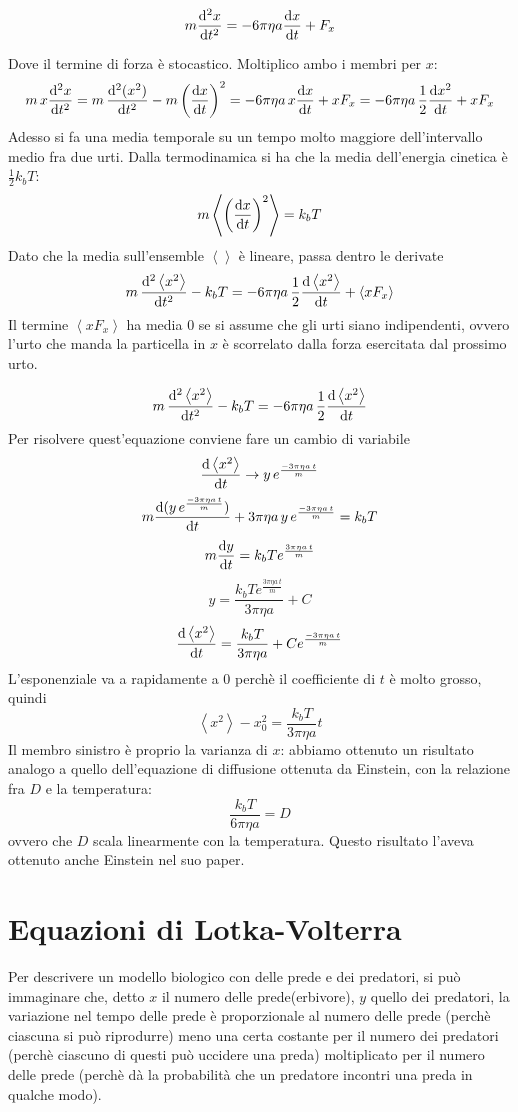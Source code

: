 \documentclass[a4paper,12pt]{article}
\theoremstyle{plain}
\theoremstyle{definition}
\newcommand{\f}[2]{\frac{#1}{#2}}
\newcommand{\ave}[1]{\left\langle#1\right\rangle }
\newcommand{\tem}{k_b T }
\theoremstyle{remark}
\begin{document}
	\[m\dv[2]{x}{t}=-6\pi\eta a\dv{x}{t}	+F_x	\]
	
	Dove il termine di forza è stocastico. Moltiplico ambo i membri per $x$:
	\[m\,x\dv[2]{x}{t}=m\,\dv[2]{(x^2)}{t}-m \left(\dv{x}{t}\right)^2=-6\pi\eta a\,x\dv{x}{t}	+x F_x=-6\pi\eta a\,\f{1}{2}\dv{x^2}{t}	+x F_x	\]
	Adesso si fa una media temporale su un tempo molto maggiore dell'intervallo medio fra due urti.
	Dalla termodinamica si ha che la media dell'energia cinetica è $\f{1}{2}\tem$:\[m \ave{\left(\dv{x}{t}\right)^2}=\tem\] 
	Dato che la media sull'ensemble $\ave{}$ è lineare, passa dentro le derivate
	\[m\,{\dv[2]{\ave{x^2}}{t}}- \tem=-6\pi\eta a\,\f{1}{2}{\dv{\ave{x^2}}{t}}	+\ave{x F_x}	\]
	Il termine $\ave{xF_x}$ ha media 0 se si assume che gli urti siano indipendenti, ovvero l'urto che manda la particella in $x$ è scorrelato dalla forza esercitata dal prossimo urto.
	
	\[m\,{\dv[2]{\ave{x^2}}{t}}- \tem=-6\pi\eta a\,\f{1}{2}{\dv{\ave{x^2}}{t}}	\]
	Per risolvere quest'equazione conviene fare un cambio di variabile
	\[\dv{\ave{x^2}}{t}\rightarrow y\,e^{\f{-3\pi\eta a \,t}{m}}\]
	\[m\dv{(y\,e^{\f{-3\pi\eta a \,t}{m}})}{t}+3\pi\eta a\,y\,e^{\f{-3\pi\eta a \,t}{m}}=\tem\]
	\[m\dv{y}{t}=\tem e^{\f{3\pi\eta a \,t}{m}}\]
	\[y=\f{\tem  e^{\f{3\pi\eta a \,t}{m}}}{3\pi\eta a }+C\]
	\[\dv{\ave{x^2}}{t}=\f{\tem }{3\pi\eta a }+C e^{\f{-3\pi\eta a \,t}{m}}\]
	L'esponenziale va a rapidamente a 0 perchè il coefficiente di $t$ è molto grosso, quindi
	\[\ave{x^2}-{x_0^2}=\f{\tem }{3\pi\eta a } t		\]
	Il membro sinistro è proprio la varianza di $x$: abbiamo ottenuto un risultato analogo a quello dell'equazione di diffusione ottenuta da Einstein, con la relazione fra $D$ e la temperatura:
	\[\f{\tem }{6\pi\eta a } =D		\]
	ovvero che $D$ scala linearmente con la temperatura. Questo risultato l'aveva ottenuto anche Einstein nel suo paper.
	\section{Equazioni di Lotka-Volterra}
	Per descrivere un modello biologico con delle prede e dei predatori, si può immaginare che, detto $x$ il numero delle prede(erbivore), $y$ quello dei predatori, la variazione nel tempo delle prede è proporzionale al numero delle prede (perchè ciascuna si può riprodurre) meno una certa costante per il numero dei predatori (perchè ciascuno di questi può uccidere una preda) moltiplicato per il numero delle prede (perchè dà la probabilità che un predatore incontri una preda in qualche modo).\\
\end{document}

